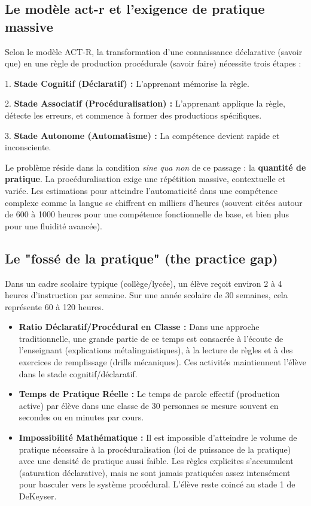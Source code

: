 \subsection{Le modèle act-r et l'exigence de pratique massive}

Selon le modèle ACT-R, la transformation d'une connaissance déclarative (\og savoir que\fg{}) en une
règle de production procédurale (\og savoir faire\fg{}) nécessite trois étapes :

1. \textbf{Stade Cognitif (Déclaratif) :} L'apprenant mémorise la règle.

2. \textbf{Stade Associatif (Procéduralisation) :} L'apprenant applique la règle, détecte les
erreurs, et commence à former des productions spécifiques.

3. \textbf{Stade Autonome (Automatisme) :} La compétence devient rapide et inconsciente.

Le problème réside dans la condition \textit{sine qua non} de ce passage : la \textbf{quantité de
pratique}. La procéduralisation exige une répétition massive, contextuelle et
variée.\cite{II-2-2-ref38} Les estimations pour atteindre l'automaticité dans une compétence
complexe comme la langue se chiffrent en milliers d'heures (souvent citées autour de 600 à 1000
heures pour une compétence fonctionnelle de base, et bien plus pour une fluidité
avancée).\cite{II-2-2-ref41}



\subsection{Le "fossé de la pratique" (the practice gap)}

Dans un cadre scolaire typique (collège/lycée), un élève reçoit environ 2 à 4 heures d'instruction
par semaine. Sur une année scolaire de 30 semaines, cela représente 60 à 120 heures.

\begin{itemize}\item \textbf{Ratio Déclaratif/Procédural en Classe :} Dans une approche traditionnelle, une grande partie de ce temps est consacrée à l'écoute de l'enseignant (explications métalinguistiques), à la lecture de règles et à des exercices de remplissage (drills mécaniques). Ces activités maintiennent l'élève dans le stade cognitif/déclaratif.\item \textbf{Temps de Pratique Réelle :} Le temps de parole effectif (production active) par élève dans une classe de 30 personnes se mesure souvent en secondes ou en minutes par cours.\item \textbf{Impossibilité Mathématique :} Il est impossible d'atteindre le volume de pratique nécessaire à la procéduralisation (loi de puissance de la pratique) avec une densité de pratique aussi faible. Les règles explicites s'accumulent (saturation déclarative), mais ne sont jamais pratiquées assez intensément pour basculer vers le système procédural.\cite{II-2-2-ref43} L'élève reste \og coincé\fg{} au stade 1 de DeKeyser.\end{itemize}


